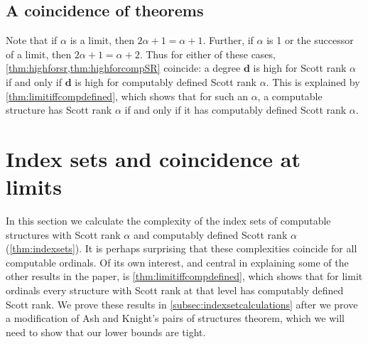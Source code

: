 \documentclass[10pt,a4paper]{amsart}
\newcommand\+[1]{\mathcal{#1}}
\renewcommand\*[1]{\mathbf{#1}}
\renewcommand\=[1]{\text{#1}}
\renewcommand\*[1]{\mathbf{#1}}
\begin{document}
\subsection{A coincidence of theorems}

Note that if $\alpha$ is a limit, then $2\alpha+1 = \alpha+1$.  Further, if $\alpha$ is 1 or the successor of a limit, then $2\alpha+1 = \alpha+2$.  Thus for either of these cases, \cref{thm:highforsr,thm:highforcompSR} coincide: a degree $\*d$ is high for Scott rank $\alpha$ if and only if $\*d$ is high for computably defined Scott rank $\alpha$.  This is explained by \cref{thm:limitiffcompdefined}, which shows that for such an $\alpha$, a computable structure has Scott rank $\alpha$ if and only if it has computably defined Scott rank $\alpha$.

\section{Index sets and coincidence at limits}\label{sec:index}
In this section we calculate the complexity of the index sets of computable structures with Scott rank $\alpha$ and computably defined Scott rank $\alpha$ (\cref{thm:indexsets}). It is perhaps surprising that these complexities coincide for all computable ordinals. Of its own interest, and central in explaining some of the other results in the paper, is \cref{thm:limitiffcompdefined}, which shows that for limit ordinals every structure with Scott rank at that level has computably defined Scott rank. We prove these results in \cref{subsec:indexsetcalculations} after we prove a modification of Ash and Knight's pairs of structures theorem, which we will need to show that our lower bounds are tight.
\end{document}
